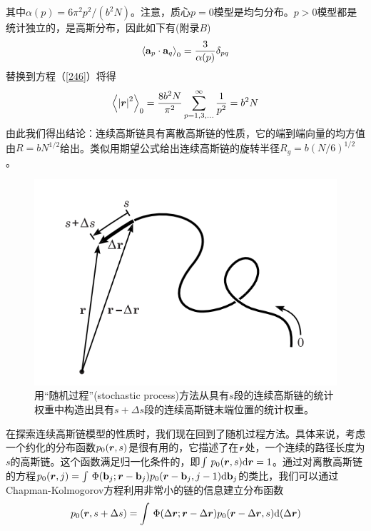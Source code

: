 其中$\alpha (p)=6\pi ^2p^2/(b^2N)$。注意，质心$p=0$模型是均匀分布。$p>0$模型都是统计独立的，是高斯分布，因此如下有(附录$B$)
\begin{equation}\label{256}
\left \langle \mathbf{a} _p \cdot \mathbf{a} _q \right \rangle _0=\frac{3}{\alpha (p)}\delta _{pq}
\end{equation}
替换到方程（\ref{246}）将得
\begin{equation}\label{257}
\left \langle \left| \bm{r}  \right|^2 \right \rangle _0=\frac{8b^2N}{\pi ^2}\sum_{p=1,3,...}^{\infty}\frac{1}{p^2}=b^2N
\end{equation}
由此我们得出结论：连续高斯链具有离散高斯链的性质，它的端到端向量的均方值由$R=bN^{1/2}$给出。类似用期望公式给出连续高斯链的旋转半径$R_g=b(N/6)^{1/2}$。

\begin{figure}[H]
\centering
\includegraphics[scale=0.7]{./figures/42.png}
\caption{用“随机过程”(stochastic process)方法从具有$s$段的连续高斯链的统计权重中构造出具有$s+\Delta s$段的连续高斯链末端位置的统计权重。} \label{随机过程}
\end{figure}

在探索连续高斯链模型的性质时，我们现在回到了随机过程方法。具体来说，考虑一个约化的分布函数$p_0 (\bm{r} ,s)$是很有用的，它描述了在$\bm{r}$处，一个连续的路径长度为$s$的高斯链。这个函数满足归一化条件的，即$\int \,p_0(\bm{r} ,s) \mathrm{d} \bm{r} =1$。通过对离散高斯链的方程$p_0(\bm{r} ,j)=\int \,\Phi(\mathbf{b} _j;\bm{r} -\mathbf{b} _j)p_0(\bm{r} -\mathbf{b} _j,j-1) \mathrm{d} \mathbf{b} _j$的类比，我们可以通过Chapman-Kolmogorov方程利用非常小的链的信息建立分布函数
\begin{equation}\label{258}
p_0(\bm{r} ,s+\Delta s)=\int \,\Phi(\Delta \bm{r} ;\bm{r} -\Delta \bm{r} )p_0(\bm{r} -\Delta \bm{r} ,s) \mathrm{d}(\Delta \bm{r} ) 
\end{equation}

